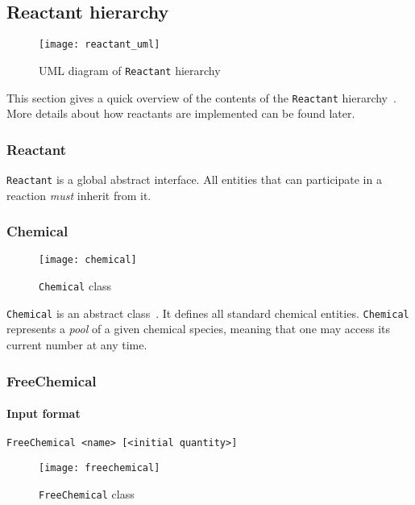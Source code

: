 
\subsection{Reactant hierarchy}

\begin{figure}[!h]
  \centering
  \texttt{[image: reactant\_uml]}
  \caption{UML diagram of \texttt{Reactant} hierarchy}
\label{fig:reactant_uml}
\end{figure}

This section gives a quick overview of the contents of the \texttt{Reactant}
hierarchy~.
More details about how reactants are implemented can be found later.

\subsubsection{Reactant}

\texttt{Reactant} is a global abstract interface.
All entities that can participate in a reaction \emph{must} inherit from it.

\subsubsection{Chemical}

\begin{figure}[!h]
  \centering
  \texttt{[image: chemical]}
  \caption{\texttt{Chemical} class}
\label{fig:chemical}
\end{figure}

\texttt{Chemical} is an abstract class~.
It defines all standard chemical entities.
\texttt{Chemical} represents a \emph{pool} of a given chemical species,
meaning that one may access its current number at any time.

\subsubsection{FreeChemical}

\paragraph{Input format}
\begin{verbatim}
FreeChemical <name> [<initial quantity>]
\end{verbatim}

\begin{figure}[!h]
  \centering
  \texttt{[image: freechemical]}
  \caption{\texttt{FreeChemical} class}
\label{fig:free_chemical}
\end{figure}

